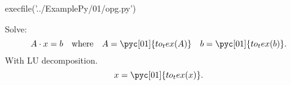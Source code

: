 \documentclass[../main.tex]{subfiles}
\begin{document}
\begin{pycode}[01]
execfile('../ExamplePy/01/opg.py')
\end{pycode}

Solve:
\[
A \cdot x = b
\quad \textrm{where}\quad
A=
\pyc[01]{to_tex(A)}
\quad
b= 
\pyc[01]{to_tex(b)}
.\] 
With LU decomposition.
\[
x=
\pyc[01]{to_tex(x)}
.\] 

\inputminted{python}{../ExamplePy/01/opg.py}
\end{document}
